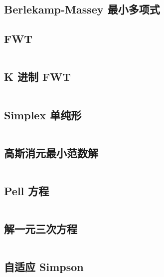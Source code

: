 \documentclass[titlepage, a4paper, 11pt]{article}
\begin{document}
\begin{spacing}{1.15}
				\subsection{Berlekamp-Massey 最小多项式}
					
				\subsection{FWT}
					\inputminted{cpp}{src/Math/FWT.cpp}
				\subsection{K 进制 FWT}
					\inputminted{cpp}{src/tbr/fwt.cpp}
				\subsection{Simplex 单纯形}
					\inputminted{cpp}{src/Math/Simplex.cpp}
				\subsection{高斯消元最小范数解}
					\inputminted{cpp}{src/Geometry/minnorm_gauss.cpp}
				\subsection{Pell 方程}
					\inputminted{cpp}{src/Math/Pell方程.cpp}
				\subsection{解一元三次方程}
					\inputminted{cpp}{src/Math/解一元三次方程.cpp}
				\subsection{自适应 Simpson}
					\inputminted{cpp}{src/Math/Simpson.cpp}
		

\end{spacing}
\end{document}
